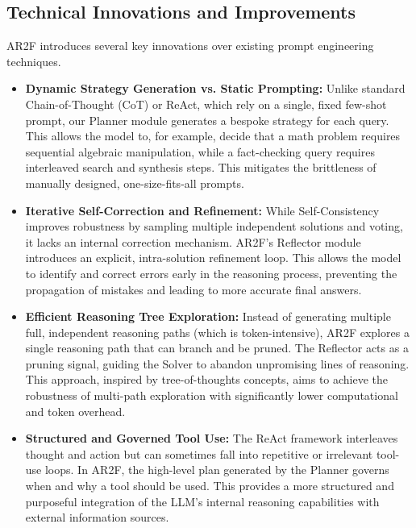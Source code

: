 \documentclass{article}
\begin{document}
\subsection{Technical Innovations and Improvements}
AR2F introduces several key innovations over existing prompt engineering techniques.

\begin{itemize}
    \item \textbf{Dynamic Strategy Generation vs. Static Prompting:} Unlike standard Chain-of-Thought (CoT) or ReAct, which rely on a single, fixed few-shot prompt, our Planner module generates a bespoke strategy for each query. This allows the model to, for example, decide that a math problem requires sequential algebraic manipulation, while a fact-checking query requires interleaved search and synthesis steps. This mitigates the brittleness of manually designed, one-size-fits-all prompts.

    \item \textbf{Iterative Self-Correction and Refinement:} While Self-Consistency improves robustness by sampling multiple independent solutions and voting, it lacks an internal correction mechanism. AR2F's Reflector module introduces an explicit, intra-solution refinement loop. This allows the model to identify and correct errors early in the reasoning process, preventing the propagation of mistakes and leading to more accurate final answers.

    \item \textbf{Efficient Reasoning Tree Exploration:} Instead of generating multiple full, independent reasoning paths (which is token-intensive), AR2F explores a single reasoning path that can branch and be pruned. The Reflector acts as a pruning signal, guiding the Solver to abandon unpromising lines of reasoning. This approach, inspired by tree-of-thoughts concepts, aims to achieve the robustness of multi-path exploration with significantly lower computational and token overhead.

    \item \textbf{Structured and Governed Tool Use:} The ReAct framework interleaves thought and action but can sometimes fall into repetitive or irrelevant tool-use loops. In AR2F, the high-level plan generated by the Planner governs when and why a tool should be used. This provides a more structured and purposeful integration of the LLM's internal reasoning capabilities with external information sources.
\end{itemize}
\end{document}
